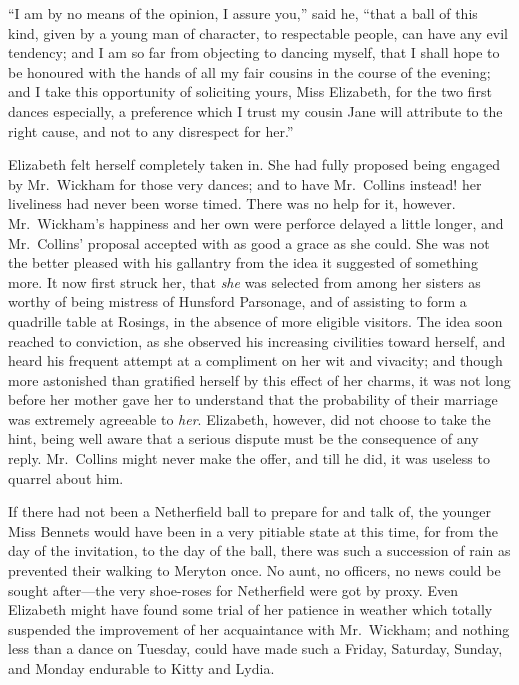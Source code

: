 \documentclass[12pt,english]{book}
\begin{document}
{}``I am by no means of the opinion, I assure you,'' said he, {}``that
a ball of this kind, given by a young man of character, to respectable
people, can have any evil tendency; and I am so far from objecting
to dancing myself, that I shall hope to be honoured with the hands
of all my fair cousins in the course of the evening; and I take this
opportunity of soliciting yours, Miss Elizabeth, for the two first
dances especially, a preference which I trust my cousin Jane will
attribute to the right cause, and not to any disrespect for her.''

Elizabeth felt herself completely taken in. She had fully proposed
being engaged by Mr.\ Wickham for those very dances; and to have
Mr.\ Collins instead! her liveliness had never been worse timed.
There was no help for it, however. Mr.\ Wickham's happiness and her
own were perforce delayed a little longer, and Mr.\ Collins' proposal
accepted with as good a grace as she could. She was not the better
pleased with his gallantry from the idea it suggested of something
more. It now first struck her, that \textit{she} was selected from
among her sisters as worthy of being mistress of Hunsford Parsonage,
and of assisting to form a quadrille table at Rosings, in the absence
of more eligible visitors. The idea soon reached to conviction, as
she observed his increasing civilities toward herself, and heard his
frequent attempt at a compliment on her wit and vivacity; and though
more astonished than gratified herself by this effect of her charms,
it was not long before her mother gave her to understand that the
probability of their marriage was extremely agreeable to \textit{her}.
Elizabeth, however, did not choose to take the hint, being well aware
that a serious dispute must be the consequence of any reply. Mr.\ Collins
might never make the offer, and till he did, it was useless to quarrel
about him.

If there had not been a Netherfield ball to prepare for and talk of,
the younger Miss Bennets would have been in a very pitiable state
at this time, for from the day of the invitation, to the day of the
ball, there was such a succession of rain as prevented their walking
to Meryton once. No aunt, no officers, no news could be sought after\mbox{---}the
very shoe-roses for Netherfield were got by proxy. Even Elizabeth
might have found some trial of her patience in weather which totally
suspended the improvement of her acquaintance with Mr.\ Wickham;
and nothing less than a dance on Tuesday, could have made such a Friday,
Saturday, Sunday, and Monday endurable to Kitty and Lydia.
\end{document}
